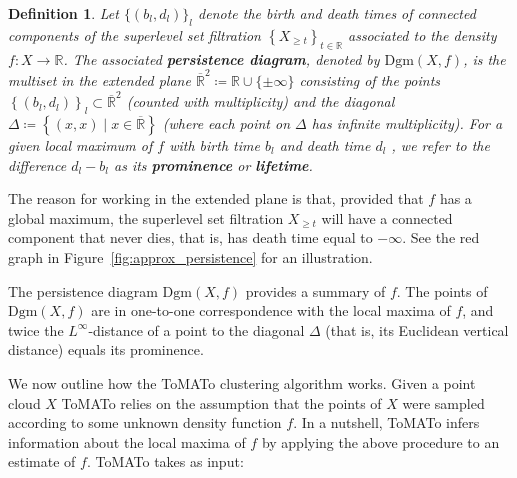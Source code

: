 \documentclass[10pt]{article} %
\theoremstyle{plain}
\newtheorem{definition}[theorem]{Definition}
\newcommand{\RR}{\mathbb{R}}
\newcommand{\tom}{ToMATo\xspace}
\newcommand{\dgm}{\mathrm{Dgm}}
\begin{document}
\begin{definition}\label{def:persistence_diagram}
Let \(\{(b_{l}, d_{l})\}_{l}\) denote the birth and death times of connected components of the superlevel set filtration \(\left\{X_{\geq t}\right\}_{t\in\RR}\) associated to the density \(f\colon X \to \RR\).
The associated \textbf{persistence diagram}, denoted by \(\dgm(X,f)\), is the multiset in the extended plane \(\overline{\RR}^{2}\coloneqq\RR\cup\{\pm\infty\}\) consisting of the points \(\left\{(b_{l}, d_{l})\right\}_{l}\subset\overline{\RR}^{2}\) (counted with multiplicity) and the diagonal \(\Delta\coloneqq\left\{(x,x)\mid x\in\overline{\RR}\right\}\) (where each point on \(\Delta\) has infinite multiplicity).
For a given local maximum of \(f\) with birth time \(b_{l}\) and death time \(d_{l}\) , we refer to the difference \(d_{l}-b_{l}\) as its \textbf{prominence} or \textbf{lifetime}.
\end{definition}
The reason for working in the extended plane is that, provided that \(f\) has a global maximum, the superlevel set filtration \(X_{\geq t}\) will have a connected component that never dies, that is, has death time equal to \(-\infty\).
See the red graph in Figure~\ref{fig:approx_persistence} for an illustration.

The persistence diagram \(\dgm(X,f)\) provides a summary of \(f\). The points of \(\dgm(X,f)\) are in one-to-one correspondence with the local maxima of \(f\), and twice the $L^{\infty}$-distance of a point to the diagonal \(\Delta\) (that is, its Euclidean vertical distance) equals its prominence.

We now outline how the \tom clustering algorithm works. Given a point cloud \(X\) \tom relies on the assumption that the points of \(X\) were sampled according to some unknown density function \(f\). In a nutshell, \tom infers information about the local maxima of \(f\) by applying the above procedure to an estimate of \(f\). \tom takes as input:
\end{document}
